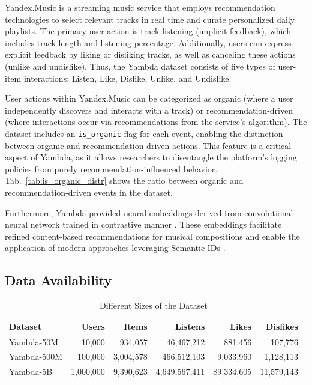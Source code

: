 \documentclass[sigconf,authorversion,nonacm]{acmart}
\begin{document}
Yandex.Music is a streaming music service that employs recommendation technologies to select relevant tracks in real time and curate personalized daily playlists. The primary user action is track listening (implicit feedback), which includes track length and listening percentage. Additionally, users can express explicit feedback by liking or disliking tracks, as well as canceling these actions (unlike and undislike). Thus, the Yambda dataset consists of five types of user-item interactions: Listen, Like, Dislike, Unlike, and Undislike.

User actions within Yandex.Music can be categorized as organic (where a user independently discovers and interacts with a track) or recommendation-driven (where interactions occur via recommendations from the service’s algorithm). The dataset includes an \texttt{is\_organic} flag for each event, enabling the distinction between organic and recommendation-driven actions. This feature is a critical aspect of Yambda, as it allows researchers to disentangle the platform’s logging policies from purely recommendation-influenced behavior. Tab.~\ref{tab:is_organic_distr} shows the ratio between organic and recommendation-driven events in the dataset.

Furthermore, Yambda provided neural embeddings derived from convolutional neural network trained in contrastive manner \cite{spijkervet2021contrastive}. These embeddings facilitate refined content-based recommendations for musical compositions and enable the application of modern approaches leveraging Semantic IDs \cite{rajput2023recommender}.

\subsection{Data Availability}

\begin{table}
  \caption{Different Sizes of the Dataset}
  \label{tab:yambda_sizes}
  \begin{tabular}{lrrrrr}
    \toprule
    Dataset & Users & Items & Listens & Likes & Dislikes\\
    \midrule
     Yambda-50M  & 10,000    & 934,057   & 46,467,212    & 881,456    & 107,776 \\
     Yambda-500M & 100,000   & 3,004,578 & 466,512,103   & 9,033,960  & 1,128,113 \\
     Yambda-5B   & 1,000,000 & 9,390,623 & 4,649,567,411 & 89,334,605 & 11,579,143 \\
    \bottomrule
  \end{tabular}
\end{table}
\end{document}
